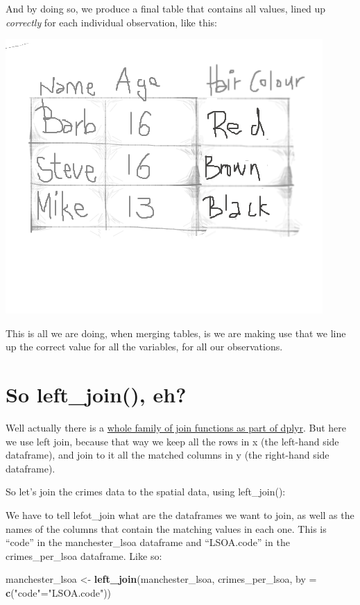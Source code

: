 \documentclass[]{book}
\newenvironment{Shaded}{\begin{snugshade}}{\end{snugshade}}
\newcommand{\DataTypeTok}[1]{\textcolor[rgb]{0.13,0.29,0.53}{#1}}
\newcommand{\KeywordTok}[1]{\textcolor[rgb]{0.13,0.29,0.53}{\textbf{#1}}}
\newcommand{\NormalTok}[1]{#1}
\newcommand{\StringTok}[1]{\textcolor[rgb]{0.31,0.60,0.02}{#1}}
\begin{document}
And by doing so, we produce a final table that contains all values, lined up \emph{correctly} for each individual observation, like this:

\includegraphics{img/merge_logic_2.png}

This is all we are doing, when merging tables, is we are making use that we line up the correct value for all the variables, for all our observations.

\hypertarget{so-left_join-eh}{%
\section{So left\_join(), eh?}\label{so-left_join-eh}}

Well actually there is a \href{http://stat545.com/bit001_dplyr-cheatsheet.html}{whole family of join functions as part of dplyr}. But here we use left join, because that way we keep all the rows in x (the left-hand side dataframe), and join to it all the matched columns in y (the right-hand side dataframe).

So let's join the crimes data to the spatial data, using left\_join():

We have to tell lefot\_join what are the dataframes we want to join, as well as the names of the columns that contain the matching values in each one. This is ``code'' in the manchester\_lsoa dataframe and ``LSOA.code'' in the crimes\_per\_lsoa dataframe. Like so:

\begin{Shaded}
\begin{Highlighting}[]
\NormalTok{manchester_lsoa <-}\StringTok{ }\KeywordTok{left_join}\NormalTok{(manchester_lsoa, crimes_per_lsoa, }\DataTypeTok{by =} \KeywordTok{c}\NormalTok{(}\StringTok{"code"}\NormalTok{=}\StringTok{"LSOA.code"}\NormalTok{))}
\end{Highlighting}
\end{Shaded}
\end{document}
